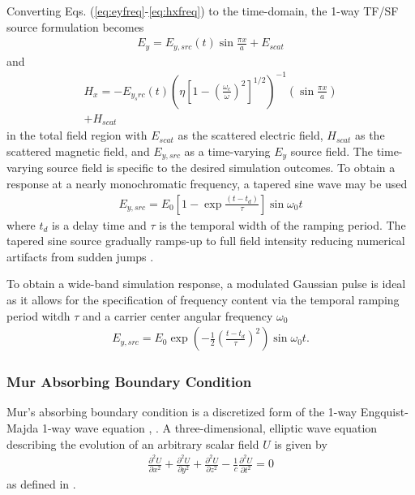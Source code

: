 Converting Eqs. (\ref{eq:eyfreq}-\ref{eq:hxfreq}) to the time-domain, the 1-way TF/SF source formulation becomes
\begin{align}
	E_y=E_{y,src}(t)\sin{\frac{\pi x}{a}} + E_{scat}
\end{align}
and
\begin{multline}
	H_x = -E_{y_src}(t)\left(\eta\left[1-\left(\frac{\omega_c}{\omega}\right)^2\right]^{1/2}\right)^{-1}\left(\sin{\frac{\pi x}{a}}\right) \\ + H_{scat}
\end{multline}
in the total field region with $E_{scat}$ as the scattered electric field, $H_{scat}$ as the scattered magnetic field, and $E_{y,src}$ as a time-varying $E_y$ source field. The time-varying source field is specific to the desired simulation outcomes. To obtain a response at a nearly monochromatic frequency, a tapered sine wave may be used 
\begin{align}
	E_{y,src} = E_0\left[1 - \exp{\frac{(t - t_d)}{\tau}}\right]\sin{\omega_0 t}
\end{align}
where $t_d$ is a delay time and $\tau$ is the temporal width of the ramping period. The tapered sine source gradually ramps-up to full field intensity reducing numerical artifacts from sudden jumps \cite{rothlecnotes}.

To obtain a wide-band simulation response, a modulated Gaussian pulse is ideal as it allows for the specification of frequency content via the temporal ramping period witdh $\tau$ and a carrier center angular frequency $\omega_0$ \cite{rothlecnotes}  
\begin{align}
	E_{y,src} = E_0\exp{\left(-\frac{1}{2}\left(\frac{t-t_d}{\tau}\right)^2\right)}\sin{\omega_0t}.
\end{align}

\subsubsection{Mur Absorbing Boundary Condition}
\label{subsubsec:murtheory}
Mur's absorbing boundary condition is a discretized form of the 1-way Engquist-Majda 1-way wave equation \cite{taftlovefdtd}, \cite{rothlecnotes}. A three-dimensional, elliptic wave equation describing the evolution of an arbitrary scalar field $U$ is given by
\begin{align}
	\frac{\partial^2 U}{\partial x^2}+\frac{\partial^2 U}{\partial y^2}+\frac{\partial^2 U}{\partial z^2}-\frac{1}{c}\frac{\partial^2 U}{\partial t^2}=0
	\label{eq:scalarelliptic}
\end{align}
as defined in \cite{taftlovefdtd}.

